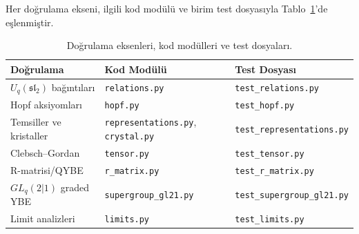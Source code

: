 \documentclass[10pt]{math}
\numberwithin{equation}{section}
\theoremstyle{plain}
\theoremstyle{definition}
\renewcommand{\sl}{\mathfrak{sl}}
\begin{document}
Her doğrulama ekseni, ilgili kod modülü ve birim test dosyasıyla
Tablo~\ref{tab:tests}'de eşlenmiştir.

\begin{table}[H]
\centering
\footnotesize
\caption{Doğrulama eksenleri, kod modülleri ve test dosyaları.}
\label{tab:tests}
\begin{tabularx}{\textwidth}{@{}>{\raggedright\arraybackslash}p{}X>{\raggedright\arraybackslash}p{}@{}}
\toprule
Doğrulama & Kod Modülü & Test Dosyası \\
\midrule
$U_q(\sl_2)$ bağıntıları & \texttt{relations.py} & \texttt{test\_relations.py} \\
Hopf aksiyomları & \texttt{hopf.py} & \texttt{test\_hopf.py} \\
Temsiller ve kristaller & \texttt{representations.py}, \texttt{crystal.py} & \texttt{test\_representations.py} \\
Clebsch--Gordan & \texttt{tensor.py} & \texttt{test\_tensor.py} \\
R-matrisi/QYBE & \texttt{r\_matrix.py} & \texttt{test\_r\_matrix.py} \\
$GL_q(2|1)$ graded YBE & \texttt{supergroup\_gl21.py} & \texttt{test\_supergroup\_gl21.py} \\
Limit analizleri & \texttt{limits.py} & \texttt{test\_limits.py} \\
\bottomrule
\end{tabularx}
\end{table}
\end{document}
